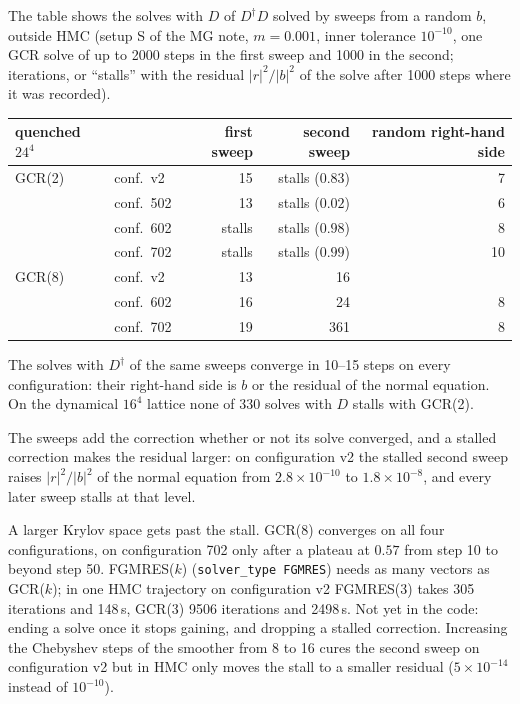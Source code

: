 \documentclass[11pt,a4paper]{article}
\numberwithin{equation}{section}
\newcommand{\dg}{^{\dagger}}
\newcommand{\code}[1]{\texttt{\small #1}}
\begin{document}
The table shows the solves with $D$ of $D\dg D$ solved by sweeps from a random $b$, outside HMC
(setup S of the MG note, $m=0.001$, inner tolerance $10^{-10}$, one GCR solve of up to 2000 steps
in the first sweep and 1000 in the second; iterations, or ``stalls'' with the residual
$|r|^2/|b|^2$ of the solve after 1000 steps where it was recorded).
\begin{center}
\begin{tabular}{@{}llrrr@{}}
\toprule
quenched $24^4$ & & first sweep & second sweep & random right-hand side\\
\midrule
GCR(2) & conf.\ v2 & 15 & stalls ($0.83$) & 7\\
 & conf.\ 502 & 13 & stalls ($0.02$) & 6\\
 & conf.\ 602 & stalls & stalls ($0.98$) & 8\\
 & conf.\ 702 & stalls & stalls ($0.99$) & 10\\
GCR(8) & conf.\ v2 & 13 & 16 & \\
 & conf.\ 602 & 16 & 24 & 8\\
 & conf.\ 702 & 19 & 361 & 8\\
\bottomrule
\end{tabular}
\end{center}
The solves with $D\dg$ of the same sweeps converge in 10--15 steps on every configuration: their
right-hand side is $b$ or the residual of the normal equation. On the dynamical $16^4$ lattice none
of 330 solves with $D$ stalls with GCR(2).

The sweeps add the correction whether or not its solve converged, and a stalled correction makes
the residual larger: on configuration v2 the stalled second sweep raises $|r|^2/|b|^2$ of the normal equation from
$2.8\times10^{-10}$ to $1.8\times10^{-8}$, and every later sweep stalls at that level.

A larger Krylov space gets past the stall. GCR(8) converges on all four configurations, on
configuration 702 only after a plateau at $0.57$ from step 10 to beyond step 50. FGMRES($k$) (\code{solver\_type FGMRES})
needs as many vectors as GCR($k$); in one HMC trajectory on configuration v2 FGMRES(3) takes 305
iterations and 148\,s, GCR(3) 9506 iterations and 2498\,s. Not yet in the code: ending a solve once
it stops gaining, and dropping a stalled correction. Increasing the Chebyshev steps of the
smoother from 8 to 16 cures the second sweep on configuration v2 but in HMC only moves the stall
to a smaller residual ($5\times10^{-14}$ instead of $10^{-10}$).
\end{document}

